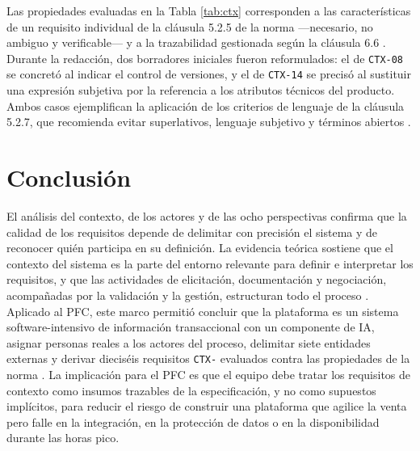 \documentclass[onecolumn,12pt]{IEEEtran}
\begin{document}
Las propiedades evaluadas en la Tabla \ref{tab:ctx} corresponden a las caracter\'isticas de un requisito individual de la cl\'ausula 5.2.5 de la norma ---necesario, no ambiguo y verificable--- y a la trazabilidad gestionada seg\'un la cl\'ausula 6.6 \cite{iso29148}. Durante la redacci\'on, dos borradores iniciales fueron reformulados: el de \texttt{CTX-08} se concret\'o al indicar el control de versiones, y el de \texttt{CTX-14} se precis\'o al sustituir una expresi\'on subjetiva por la referencia a los atributos t\'ecnicos del producto. Ambos casos ejemplifican la aplicaci\'on de los criterios de lenguaje de la cl\'ausula 5.2.7, que recomienda evitar superlativos, lenguaje subjetivo y t\'erminos abiertos \cite{iso29148}.


\section{Conclusi\'on}
El an\'alisis del contexto, de los actores y de las ocho perspectivas confirma que la calidad de los requisitos depende de delimitar con precisi\'on el sistema y de reconocer qui\'en participa en su definici\'on. La evidencia te\'orica sostiene que el contexto del sistema es la parte del entorno relevante para definir e interpretar los requisitos, y que las actividades de elicitaci\'on, documentaci\'on y negociaci\'on, acompa\~nadas por la validaci\'on y la gesti\'on, estructuran todo el proceso \cite{pohl2025,iso29148}. Aplicado al PFC, este marco permiti\'o concluir que la plataforma es un sistema software-intensivo de informaci\'on transaccional con un componente de IA, asignar personas reales a los actores del proceso, delimitar siete entidades externas y derivar diecis\'eis requisitos \texttt{CTX-} evaluados contra las propiedades de la norma \cite{iso29148,iso25010}. La implicaci\'on para el PFC es que el equipo debe tratar los requisitos de contexto como insumos trazables de la especificaci\'on, y no como supuestos impl\'icitos, para reducir el riesgo de construir una plataforma que agilice la venta pero falle en la integraci\'on, en la protecci\'on de datos o en la disponibilidad durante las horas pico.



\end{document}
